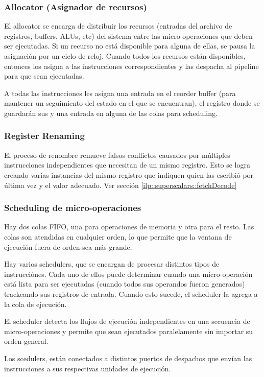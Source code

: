 \subsubsection*{Allocator (Asignador de recursos)}
El allocator se encarga de distribuir los recursos (entradas del archivo de registros, buffers, ALUs, etc) del sistema entre las micro operaciones que deben ser ejecutadas. Si un recurso no está disponible para alguna de ellas, se pausa la asignación por un ciclo de reloj. Cuando todos los recursos están disponibles, entonces los asigna a las instrucciones correspondientes y las despacha al pipeline para que sean ejecutadas.

A todas las instrucciones les asigna una entrada en el reorder buffer (para mantener un seguimiento del estado en el que se encuentran), el registro donde se guardarán sus y una entrada en alguna de las colas para scheduling.

\subsubsection*{Register Renaming}
El proceso de renombre remueve falsos conflictos causados por múltiples instrucciones independientes que necesitan de un mismo registro. Esto se logra creando varias instancias del mismo registro que indiquen quien las escribió por última vez y el valor adecuado. Ver sección \ref{ilp::superscalars::fetchDecode} 

\subsubsection*{Scheduling de micro-operaciones}
Hay dos colas FIFO, una para operaciones de memoria y otra para el resto. Las colas son atendidas en cualquier orden, lo que permite que la ventana de ejecución fuera de orden sea más grande.

Hay varios schedulers, que se encargan de procesar distintos tipos de instrucciónes. Cada uno de ellos puede determinar cuando una micro-operación está lista para ser ejecutadas (cuando todos sus operandos fueron generados) trackeando sus registros de entrada. Cuando esto sucede, el scheduler la agrega a la cola de ejecución.

El scheduler detecta los flujos de ejecución independientes en una secuencia de micro-operaciones y permite que sean ejecutados paralelamente sin importar su orden general.

Los scedulers, están conectados a distintos puertos de despachos que envían las instrucciones a sus respectivas unidades de ejecución.


